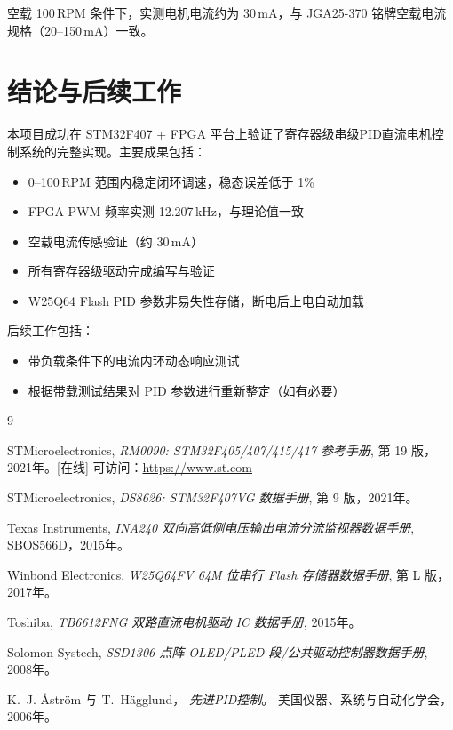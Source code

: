 \documentclass[12pt, a4paper]{ctexrep}
\begin{document}
空载 100\,RPM 条件下，实测电机电流约为 30\,mA，与 JGA25-370 铭牌空载电流规格（20--150\,mA）一致。

\section{结论与后续工作}

本项目成功在 STM32F407 + FPGA 平台上验证了寄存器级串级PID直流电机控制系统的完整实现。主要成果包括：

\begin{itemize}
    \item 0--100\,RPM 范围内稳定闭环调速，稳态误差低于 1\%
    \item FPGA PWM 频率实测 12.207\,kHz，与理论值一致
    \item 空载电流传感验证（约 30\,mA）
    \item 所有寄存器级驱动完成编写与验证
    \item W25Q64 Flash PID 参数非易失性存储，断电后上电自动加载
\end{itemize}

后续工作包括：
\begin{itemize}
    \item 带负载条件下的电流内环动态响应测试
    \item 根据带载测试结果对 PID 参数进行重新整定（如有必要）
\end{itemize}


\begin{thebibliography}{9}

STMicroelectronics,
\textit{RM0090: STM32F405/407/415/417 参考手册},
第 19 版，2021年。[在线] 可访问：\url{https://www.st.com}

STMicroelectronics,
\textit{DS8626: STM32F407VG 数据手册},
第 9 版，2021年。

Texas Instruments,
\textit{INA240 双向高低侧电压输出电流分流监视器数据手册}, SBOS566D，2015年。

Winbond Electronics,
\textit{W25Q64FV 64M 位串行 Flash 存储器数据手册},
第 L 版，2017年。

Toshiba,
\textit{TB6612FNG 双路直流电机驱动 IC 数据手册},
2015年。

Solomon Systech,
\textit{SSD1306 点阵 OLED/PLED 段/公共驱动控制器数据手册}, 2008年。

K.~J. \AA{}str\"{o}m 与 T.~H\"{a}gglund，
\textit{先进PID控制}。
美国仪器、系统与自动化学会，2006年。

\end{thebibliography}
\end{document}
